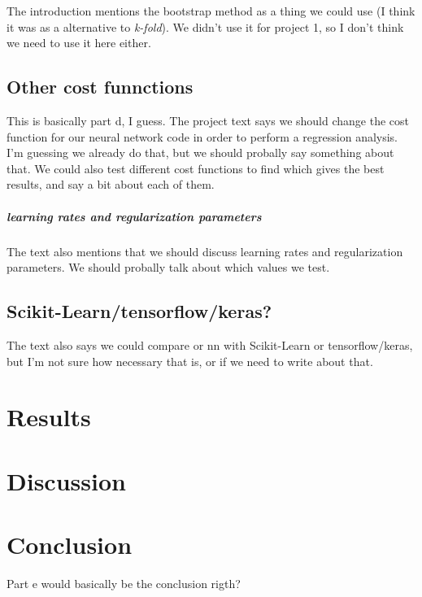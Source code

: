 \documentclass[a4paper,10pt,english]{article}
\begin{document}
\begin{multicols*}{2}
The introduction mentions the bootstrap method as a thing we could use (I think it was as a alternative to \textit{k-fold}). We didn't use it for project 1, so I don't think we need to use it here either.


\subsection*{Other cost funnctions}

This is basically part d, I guess. The project text says we should change the cost function for our neural network code in order to perform a regression analysis. I'm guessing we already do that, but we should probally say something about that. We could also test different cost functions to find which gives the best results, and say a bit about each of them. 


\subparagraph*{learning rates and regularization parameters}

The text also mentions that we should discuss learning rates and regularization parameters. We should probally talk about which values we test. 


\subsection*{Scikit-Learn/tensorflow/keras?}

The text also says we could compare or nn with Scikit-Learn or tensorflow/keras, but I'm not sure how necessary that is, or if we need to write about that.




\section*{Results}





\section*{Discussion}







\section*{Conclusion}

Part e would basically be the conclusion rigth?




\end{multicols*}
\end{document}
